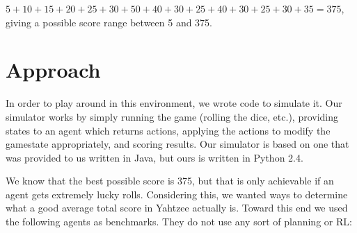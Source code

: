 \documentclass{article}
\begin{document}
\vspace{1em}

$5+10+15+20+25+30+50+40+30+25+40+30+25+30+35=375$, giving a possible score range
between 5 and 375.

\section{Approach}

In order to play around in this environment, we wrote code to simulate it. Our
simulator works by simply running the game (rolling the dice, etc.), providing
states to an agent which returns actions, applying the actions to modify the
gamestate appropriately, and scoring results. Our simulator is based on one that
was provided to us written in Java, but ours is written in Python 2.4.

\vspace{1em}

We know that the best possible score is 375, but that is only achievable if an
agent gets extremely lucky rolls. Considering this, we wanted ways to
determine what a good average total score in Yahtzee actually is. Toward this
end we used the following agents as benchmarks. They do not use any sort of
planning or RL:
\end{document}
